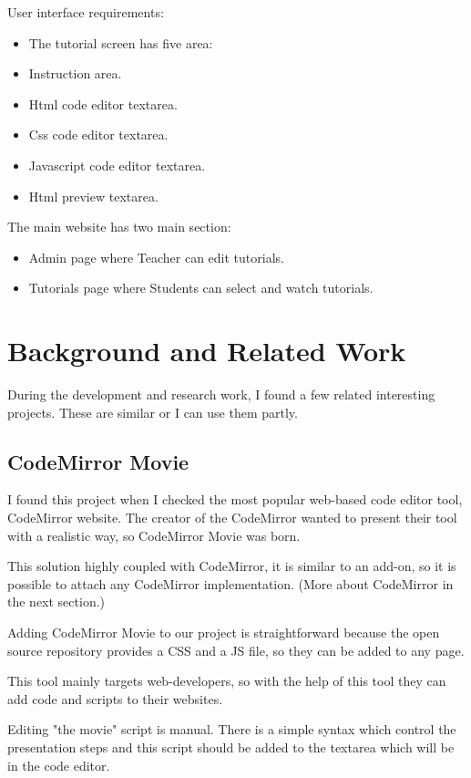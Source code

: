\documentclass[11pt, a4paper, twoside, openright]{report}
\begin{document}
\noindent User interface requirements:
\begin{itemize}[noitemsep]
\item The tutorial screen has five area:
\item Instruction area.
\item Html code editor textarea.
\item Css code editor textarea.
\item Javascript code editor textarea.
\item Html preview textarea.
\end{itemize}

\noindent The main website has two main section:
\begin{itemize}[noitemsep]
\item Admin page where Teacher can edit tutorials.
\item Tutorials page where Students can select and watch tutorials.
\end{itemize}

\chapter{Background and Related Work}

During the development and research work, I found a few related interesting projects. These are similar or I can use them partly.

\section{CodeMirror Movie}

I found this project when I checked the most popular web-based code editor tool, CodeMirror website. The creator of the CodeMirror wanted to present their tool with a realistic way, so CodeMirror Movie was born. \cite{cm-movie}

This solution highly coupled with CodeMirror, it is similar to an add-on, so it is possible to attach any CodeMirror implementation. (More about CodeMirror in the next section.)

Adding CodeMirror Movie to our project is straightforward because the open source repository provides a CSS and a JS file, so they can be added to any page.

This tool mainly targets web-developers, so with the help of this tool they can add code and scripts to their websites.

Editing "the movie" script is manual. There is a simple syntax which control the presentation steps and this script should be added to the textarea which will be in the code editor.
\end{document}
